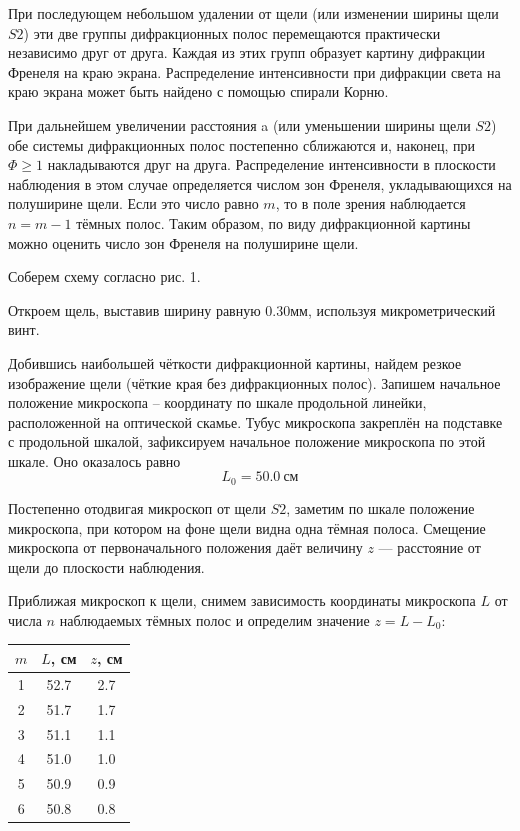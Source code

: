 \documentclass[14pt]{article}
\begin{document}
При последующем небольшом удалении от щели (или изменении ширины щели $S2$) эти две группы дифракционных полос перемещаются практически независимо друг от друга. Каждая из этих групп образует картину дифракции Френеля на краю экрана. Распределение интенсивности при дифракции света на краю экрана может быть найдено с помощью спирали Корню. 

При дальнейшем увеличении расстояния a (или уменьшении ширины щели $S2$) обе системы дифракционных полос постепенно сближаются и, наконец, при $\Phi \geq 1$ накладываются друг на друга. Распределение интенсивности в плоскости наблюдения в этом случае определяется числом зон Френеля, укладывающихся на полуширине щели. Если это число равно $m$, то в поле зрения наблюдается $n = m - 1$ тёмных полос. Таким образом, по виду дифракционной картины можно оценить число зон Френеля на полуширине щели.

\vspace{1cm}
Соберем схему согласно рис. 1.

Откроем щель, выставив ширину равную 0.30мм, используя микрометрический винт.

Добившись наибольшей чёткости дифракционной картины, найдем резкое изображение щели (чёткие края без дифракционных полос). Запишем начальное положение микроскопа -- координату по шкале продольной линейки, расположенной на оптической скамье. Тубус микроскопа закреплён на подставке с продольной шкалой, зафиксируем начальное положение микроскопа по этой шкале. Оно оказалось равно
$$
	L_0 = 50.0~\text{см}
$$

Постепенно отодвигая микроскоп от щели $S2$, заметим по шкале положение микроскопа, при котором на фоне щели видна одна тёмная полоса. Смещение микроскопа от первоначального положения даёт величину $z$ — расстояние от щели до плоскости наблюдения. 

Приближая микроскоп к щели, снимем зависимость координаты микроскопа $L$ от числа $n$ наблюдаемых тёмных полос и определим значение $z = L - L_0$:

\begin{center}
\begin{tabular}{|c|c|c|}
\hline
$m$	&	$L$, см	&	$z$, см	\\
\hline
1	&	52.7	&	2.7		\\
\hline
2	&	51.7	&	1.7		\\
\hline
3	&	51.1	&	1.1		\\
\hline
4	&	51.0	&	1.0		\\
\hline
5	&	50.9	&	0.9		\\
\hline
6	&	50.8	&	0.8		\\
\hline
\end{tabular}
\end{center}
\end{document}
